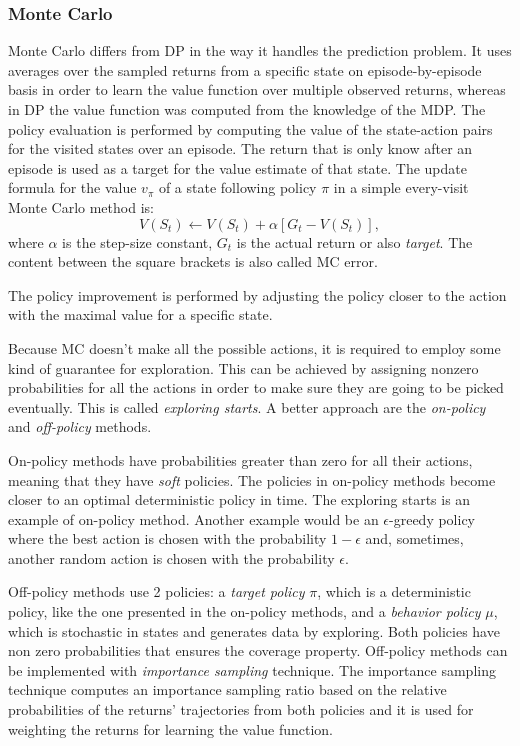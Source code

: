 \subsubsection{Monte Carlo}
Monte Carlo differs from DP in the way it handles the prediction problem. It uses averages over the sampled returns from a specific state on episode-by-episode basis in order to learn the value function over multiple observed returns, whereas in DP the value function was computed from the knowledge of the MDP. The policy evaluation is performed by computing the value of the state-action pairs for the visited states over an episode. The return that is only know after an episode is used as a target for the value estimate of that state. The update formula for the value $v_{\pi}$ of a state following policy $\pi$ in a simple every-visit Monte Carlo method is:
\begin{equation}\label{PolicyEvaluationMC}
V(S_{t})\leftarrow V(S_{t})+\alpha \left [ G_{t}-V(S_{t}) \right ],
\end{equation}
where $\alpha$ is the step-size constant, $G_{t}$ is the actual return or also \textit{target}. The content between the square brackets is also called MC error.

The policy improvement is performed by adjusting the policy closer to the action with the maximal value for a specific state.

Because MC doesn't make all the possible actions, it is required to employ some kind of guarantee for exploration. This can be achieved by assigning nonzero probabilities for all the actions in order to make sure they are going to be picked eventually. This is called \textit{exploring starts}. A better approach are the \textit{on-policy} and \textit{off-policy} methods. 

On-policy methods have probabilities greater than zero for all their actions, meaning that they have \textit{soft} policies. The policies in on-policy methods become closer to an optimal deterministic policy in time. The exploring starts is an example of on-policy method. Another example would be an $\epsilon$-greedy policy where the best action is chosen with the probability $1-\epsilon$ and, sometimes, another random action is chosen with the probability $\epsilon$.

Off-policy methods use 2 policies: a \textit{target policy} $\pi$, which is a deterministic policy, like the one presented in the on-policy methods, and a \textit{behavior policy} $\mu$, which is stochastic in states and generates data by exploring. Both policies have non zero probabilities that ensures the coverage property. Off-policy methods can be implemented with \textit{importance sampling} technique. The importance sampling technique computes an importance sampling ratio based on the relative probabilities of the returns' trajectories from both policies and it is used for weighting the returns for learning the value function.

